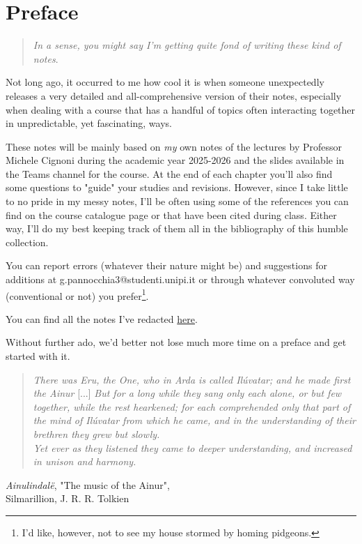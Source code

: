 \chapter*{Preface}

\begin{quote}
    \emph{In a sense, you might say I'm getting quite fond of writing these kind of notes}.
\end{quote}
Not long ago, it occurred to me how cool it is when someone unexpectedly releases a very detailed and all-comprehensive version of their notes, especially when dealing with a course that has a handful of topics often interacting together in unpredictable, yet fascinating, ways.
\par These notes will be mainly based on \emph{my} own notes of the lectures by Professor Michele Cignoni during the academic year 2025-2026 and the slides available in the Teams channel for the course. At the end of each chapter you'll also find some questions to "guide" your studies and revisions. However, since I take little to no pride in my messy notes, I'll be often using some of the references you can find on the course catalogue page or that have been cited during class. Either way, I'll do my best keeping track of them all in the bibliography of this humble collection.
\par You can report errors (whatever their nature might be) and suggestions for additions at g.pannocchia3@studenti.unipi.it or through whatever convoluted way (conventional or not) you prefer\footnote{I'd like, however, not to see my house stormed by homing pidgeons.}.
\par You can find all the notes I've redacted \href{https://github.com/gpannocchia3}{here}.
\par Without further ado, we'd better not lose much more time on a preface and get started with it.
\begin{quote}
    \emph{There was Eru, the One, who in Arda is called Ilúvatar; and he made first the Ainur} [...] \emph{But for a long while they sang only each alone, or but few together, while the rest hearkened; for each comprehended only that part of the mind of Ilúvatar from which he came, and in the understanding of their brethren they grew but slowly. \\
    Yet ever as they listened they came to deeper understanding, and increased in unison and harmony.}
\end{quote}

\begin{flushright}
    \emph{Ainulindalë}, "The music of the Ainur",\\
    Silmarillion, J. R. R. Tolkien
\end{flushright}